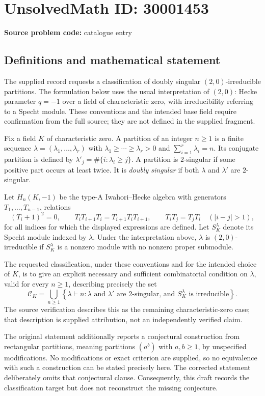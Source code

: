 \documentclass[11pt]{article}
\begin{document}
\section*{UnsolvedMath ID: 30001453}
\textbf{Source problem code:} catalogue entry
\subsection{Definitions and mathematical statement}
The supplied record requests a classification of doubly singular \((2,0)\)-irreducible partitions. The formulation below uses the usual interpretation of \((2,0)\): Hecke parameter \(q=-1\) over a field of characteristic zero, with irreducibility referring to a Specht module. These conventions and the intended base field require confirmation from the full source; they are not defined in the supplied fragment.

Fix a field \(K\) of characteristic zero. A partition of an integer \(n\geq 1\) is a finite sequence \(\lambda=(\lambda_1,\ldots,\lambda_r)\) with \(\lambda_1\geq\cdots\geq\lambda_r>0\) and \(\sum_{i=1}^{r}\lambda_i=n\). Its conjugate partition is defined by \(\lambda'_j=\#\{i:\lambda_i\geq j\}\). A partition is \(2\)-singular if some positive part occurs at least twice. It is \emph{doubly singular} if both \(\lambda\) and \(\lambda'\) are \(2\)-singular.

Let \(H_n(K,-1)\) be the type-A Iwahori--Hecke algebra with generators \(T_1,\ldots,T_{n-1}\), relations
\[
(T_i+1)^2=0,\qquad
T_iT_{i+1}T_i=T_{i+1}T_iT_{i+1},\qquad
T_iT_j=T_jT_i\quad (|i-j|>1),
\]
for all indices for which the displayed expressions are defined. Let \(S_K^\lambda\) denote its Specht module indexed by \(\lambda\). Under the interpretation above, \(\lambda\) is \((2,0)\)-irreducible if \(S_K^\lambda\) is a nonzero module with no nonzero proper submodule.

The requested classification, under these conventions and for the intended choice of \(K\), is to give an explicit necessary and sufficient combinatorial condition on \(\lambda\), valid for every \(n\geq1\), describing precisely the set
\[
\mathcal C_K=
\bigcup_{n\geq1}
\left\{\lambda\vdash n:
\lambda\text{ and }\lambda'\text{ are }2\text{-singular, and }
S_K^\lambda\text{ is irreducible}\right\}.
\]
The source verification describes this as the remaining characteristic-zero case; that description is supplied attribution, not an independently verified claim.

The original statement additionally reports a conjectural construction from rectangular partitions, meaning partitions \((a^b)\) with \(a,b\geq1\), by unspecified modifications. No modifications or exact criterion are supplied, so no equivalence with such a construction can be stated precisely here. The corrected statement deliberately omits that conjectural clause. Consequently, this draft records the classification target but does not reconstruct the missing conjecture.
\end{document}
